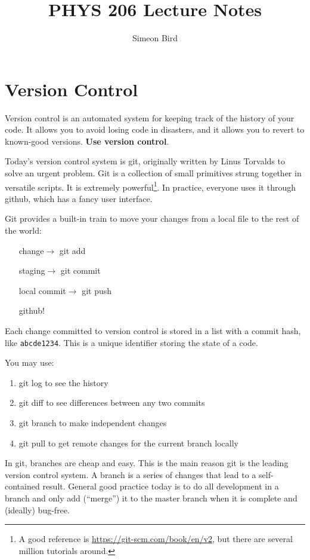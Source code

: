 \documentclass[12pt]{article}
\begin{document}
\title{PHYS 206 Lecture Notes}
\author{Simeon Bird}
\maketitle

\section{Version Control}

Version control is an automated system for keeping track of the history of your code. It allows you to avoid losing code in disasters, and it allows you to revert to known-good versions. \textbf{Use version control}.

Today's version control system is git, originally written by Linus Torvalds to solve an urgent problem. Git is a collection of small primitives strung together in versatile scripts. It is extremely powerful\footnote{A good reference is \url{https://git-scm.com/book/en/v2}, but there are several million tutorials around.}. In practice, everyone uses it through github, which has a fancy user interface.

Git provides a built-in train to move your changes from a local file to the rest of the world:

\begin{enumerate}
 \item[change$\rightarrow$] git add
 \item[staging$\rightarrow$] git commit
 \item[local commit$\rightarrow$] git push
 \item[github!]
\end{enumerate}

Each change committed to version control is stored in a list with a commit hash, like \texttt{abcde1234}. This is a unique identifier storing the state of a code.

You may use:
\begin{enumerate}
 \item git log to see the history
 \item git diff to see differences between any two commits
 \item git branch to make independent changes
 \item git pull to get remote changes for the current branch locally
\end{enumerate}

In git, branches are cheap and easy. This is the main reason git is the leading version control system. A branch is a series of changes that lead to a self-contained result. General good practice today is to do all development in a branch and only add (``merge'') it to the master branch when it is complete and (ideally) bug-free.
\end{document}
